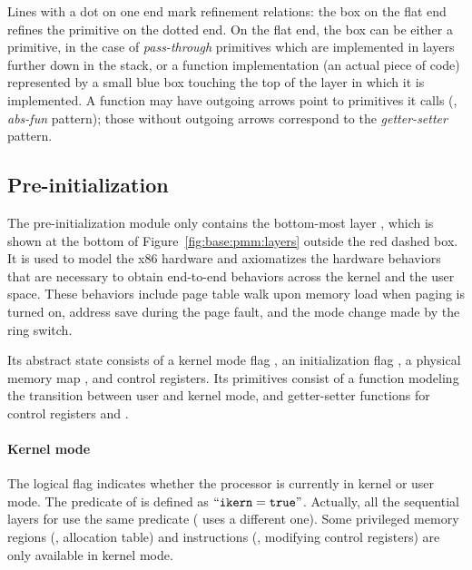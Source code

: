 Lines with a dot on one end mark refinement relations: the box on the
flat end refines the primitive on the dotted end. On the flat end, the
box can be either a primitive, in the case of \emph{pass-through}
primitives which are implemented in layers further down in the stack,
or a function implementation (an actual piece of code) represented by
a small blue box touching the top of the layer in which it is
implemented.  A function may have outgoing arrows point to primitives
it calls (\ie, \emph{abs-fun} pattern); those without
outgoing arrows correspond to the \emph{getter-setter} pattern.

\subsection{Pre-initialization}
\label{sec:base:preinit}
The pre-initialization module only contains the bottom-most layer
, which is shown at the bottom of Figure~\ref{fig:base:pmm:layers} outside the red dashed box. It is used to model the x86 hardware and axiomatizes the
hardware behaviors that are necessary to obtain end-to-end behaviors
across the kernel and the user space. These behaviors include page
table walk upon memory load when paging is turned on, 
address save during the page fault,
and the mode change made by the ring switch.
Its abstract state consists of a kernel mode flag ,
an initialization flag ,
a physical memory map ,
and control registers.
Its primitives consist of
a function modeling the transition between user and kernel mode,
and 
getter-setter functions for control registers and .

\paragraph{Kernel mode} The logical flag  indicates
whether the processor is currently in kernel or user mode.
The  predicate of 
is defined as $``{\texttt{ikern}} ={\texttt{true}}"$.
Actually, all the sequential layers for \mCTOS{} use the same
  predicate
 (\mCTOShyper{} uses a different one).
Some privileged
memory regions (\eg, allocation table) and 
instructions (\eg, modifying control registers)
are only available in kernel mode.



